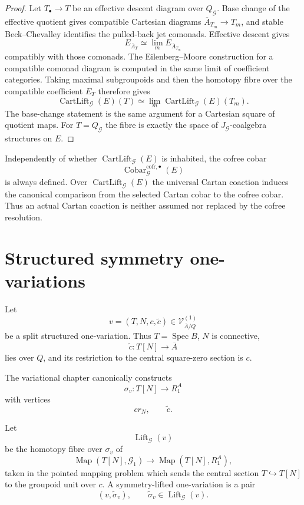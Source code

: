 \begin{proof}
Let $T_\bullet\to T$ be an effective descent diagram over $Q_{\mathcal G}$.
Base change of the effective quotient gives compatible Cartesian diagrams
$\overline A_{T_m}\to T_m$, and stable Beck--Chevalley identifies the pulled-back
jet comonads.  Effective descent gives
\[
E_{\overline A_T}
\simeq
\lim_m E_{\overline A_{T_m}}
\]
compatibly with those comonads.  The Eilenberg--Moore construction for a compatible
comonad diagram is computed in the same limit of coefficient categories.  Taking
maximal subgroupoids and then the homotopy fibre over the compatible coefficient
$E_T$ therefore gives
\[
\operatorname{CartLift}_{\mathcal G}(E)(T)
\simeq
\lim_m
\operatorname{CartLift}_{\mathcal G}(E)(T_m).
\]
The base-change statement is the same argument for a Cartesian square of quotient
maps.  For $T=Q_{\mathcal G}$ the fibre is exactly the space of
$J_{\mathcal G}$-coalgebra structures on $E$.
\end{proof}

\begin{construction}
\label{constr:symmetry-noether-cofree-cartan-comparison}
Independently of whether
$\operatorname{CartLift}_{\mathcal G}(E)$ is inhabited, the cofree cobar
\[
\operatorname{Cobar}_{\mathcal G}^{\mathrm{cofr},\bullet}(E)
\]
is always defined.  Over $\operatorname{CartLift}_{\mathcal G}(E)$ the universal
Cartan coaction induces the canonical comparison from the selected Cartan cobar to
the cofree cobar.  Thus an actual Cartan coaction is neither assumed nor replaced
by the cofree resolution.
\end{construction}

\section{Structured symmetry one-variations}
\label{sec:symmetry-noether-structured-symmetry-one-variations}

Let
\[
v=(T,N,c,\widetilde c)
\in
\mathcal V_{\overline A/Q}^{(1)}
\]
be a split structured one-variation.  Thus
$T=\operatorname{Spec}B$, $N$ is connective,
\[
\widetilde c:T[N]\longrightarrow\overline A
\]
lies over $Q$, and its restriction to the central square-zero section is $c$.

The variational chapter canonically constructs
\[
\sigma_v:
T[N]\longrightarrow R^A_1
\]
with vertices
\[
cr_N,\qquad \widetilde c.
\]

\begin{definition}
\label{def:symmetry-noether-space-of-symmetry-lifts}
Let
\[
\operatorname{Lift}_{\mathcal G}(v)
\]
be the homotopy fibre over $\sigma_v$ of
\[
\operatorname{Map}(T[N],\mathcal G_1)
\longrightarrow
\operatorname{Map}(T[N],R^A_1),
\]
taken in the pointed mapping problem which sends the central section
$T\hookrightarrow T[N]$ to the groupoid unit over $c$.
A symmetry-lifted one-variation is a pair
\[
(v,\widetilde\sigma_v),
\qquad
\widetilde\sigma_v\in
\operatorname{Lift}_{\mathcal G}(v).
\]
\end{definition}

